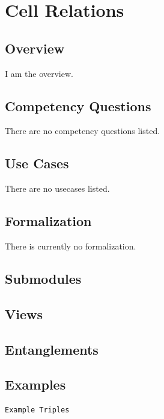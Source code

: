 \section{Cell Relations}
\label{fig:cell-relations}
\subsection{Overview}
\label{ssec:overview}
I am the overview.



\subsection{Competency Questions}
\label{ssec:cqs}
There are no competency questions listed.

\subsection{Use Cases}
\label{ssec:use-cases}
There are no usecases listed.

\subsection{Formalization}
\label{ssec:formalization}
There is currently no formalization.

\subsection{Submodules}
\label{ssec:submodules}


\subsection{Views}
\label{ssec:views}


\subsection{Entanglements}
\label{ssec:entanglements}


\subsection{Examples}
\label{ssec:examples}
\begin{verbatim}
Example Triples
\end{verbatim}


